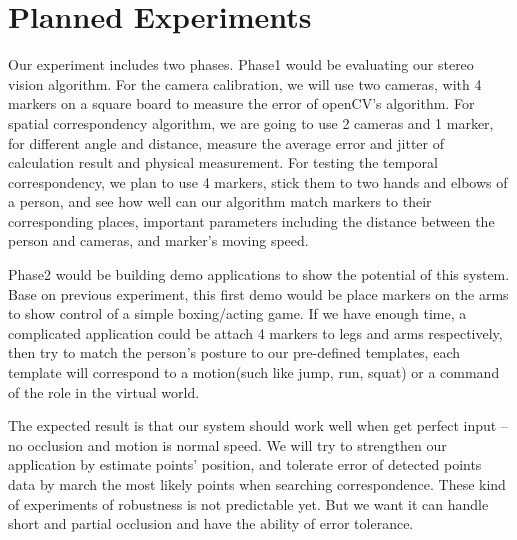 \documentclass[10pt,twocolumn,letterpaper]{article}
\begin{document}
\section{Planned Experiments}

Our experiment includes two phases. Phase1 would be evaluating 
our stereo vision algorithm. For the camera calibration, we will use 
two cameras, with 4 markers on a square board to measure the error 
of openCV's algorithm.
For spatial correspondency algorithm, we are going to use 2 cameras and 1 marker,
for different angle and distance, measure the average error and jitter of calculation
result and physical measurement.
For testing the temporal correspondency, we plan to use 4 markers, stick them to 
two hands and elbows of a person, and see how well can our algorithm match markers 
to their corresponding places, important parameters including the distance between 
the person and cameras, and marker's moving speed.

Phase2 would be building demo applications to show the potential of this system.
Base on previous experiment, this first demo would be place markers on the arms 
to show control of a simple boxing/acting game. If we have enough time, a complicated
application could be attach 4 markers to legs and arms respectively, then try to match 
the person's posture to our pre-defined templates, each template will correspond to 
a motion(such like jump, run, squat) or a command of the role in the virtual world.

The expected result is that our system should work well when get perfect input 
-- no occlusion and motion is normal speed. We will try to strengthen 
our application by estimate points' position, and tolerate error of detected 
points data by march the most likely points when searching correspondence. 
These kind of experiments of robustness is not predictable yet. 
But we want it can handle short and partial occlusion and have the ability of error tolerance. 

{\small


}

\end{document}
